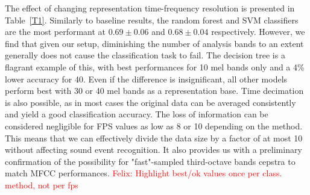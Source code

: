 \documentclass[final,3p,times,twocolumn]{elsarticle}
\newcommand{\fg}[1]{\textcolor{red}{ Felix: #1}}
\begin{document}
The effect of changing representation time-frequency resolution is presented in Table~\ref{T1}. Similarly to baseline results, the random forest and SVM classifiers are the most performant at $0.69\pm 0.06$ and $0.68\pm 0.04$ respectively. However, we find that given our setup, diminishing the number of analysis bands to an extent generally does not cause the classification task to fail. The decision tree is a flagrant example of this, with best performances for 10 mel bands only and a 4\% lower accuracy for 40. Even if the difference is insignificant, all other models perform best with 30 or 40 mel bands as a representation base. Time decimation is also possible, as in most cases the original data can be averaged consistently and yield a good classification accuracy. The loss of information can be considered negligible for FPS values as low as 8 or 10 depending on the method. This means that we can effectively divide the data size by a factor of at most 10 without affecting sound event recognition. It also provides us with a preliminary confirmation of the possibility for "fast"-sampled third-octave bands cepstra to match  MFCC performances.\fg{Highlight best/ok values once per class. method, not per fps}\\
\end{document}
